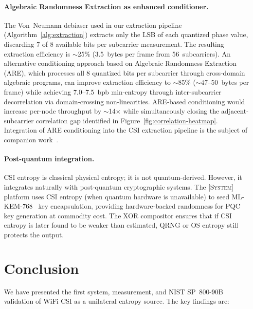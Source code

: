 \documentclass[sigconf,anonymous,review]{acmart}
\newcommand{\zipminator}{\textsc{[System]}\xspace}
\begin{document}
\paragraph{Algebraic Randomness Extraction as enhanced conditioner.}
The Von~Neumann debiaser used in our extraction pipeline (Algorithm~\ref{alg:extraction}) extracts only the LSB of each quantized phase value, discarding 7 of 8 available bits per subcarrier measurement.
The resulting extraction efficiency is $\sim$25\% (3.5~bytes per frame from 56~subcarriers).
An alternative conditioning approach based on Algebraic Randomness Extraction (ARE), which processes all 8 quantized bits per subcarrier through cross-domain algebraic programs, can improve extraction efficiency to $\sim$85\% ($\sim$47--50~bytes per frame) while achieving 7.0--7.5~bpb min-entropy through inter-subcarrier decorrelation via domain-crossing non-linearities.
ARE-based conditioning would increase per-node throughput by $\sim$14$\times$ while simultaneously closing the adjacent-subcarrier correlation gap identified in Figure~\ref{fig:correlation-heatmap}.
Integration of ARE conditioning into the CSI extraction pipeline is the subject of companion work~\cite{anonymous2026b}.

\paragraph{Post-quantum integration.}
CSI entropy is classical physical entropy; it is not quantum-derived.
However, it integrates naturally with post-quantum cryptographic systems.
The \zipminator platform uses CSI entropy (when quantum hardware is unavailable) to seed ML-KEM-768~\cite{nist2024fips203} key encapsulation, providing hardware-backed randomness for PQC key generation at commodity cost.
The XOR compositor ensures that if CSI entropy is later found to be weaker than estimated, QRNG or OS entropy still protects the output.


\section{Conclusion}
\label{sec:conclusion}

We have presented the first system, measurement, and NIST SP~800-90B validation of WiFi CSI as a unilateral entropy source.
The key findings are:
\end{document}
